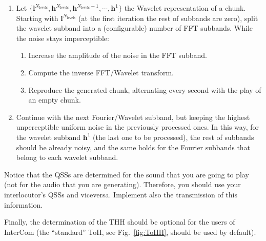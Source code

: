 \begin{enumerate}
\item Let
  $\{{\mathbf l}^{N_{\text{levels}}}, {\mathbf h}^{N_{\text{levels}}},
  {\mathbf h}^{N_{\text{levels}}-1},\cdots, {\mathbf h}^1\}$ the
  Wavelet representation of a
  chunk. %
  Starting with ${\mathbf l}^{N_{\text{levels}}}$ (at the first
  iteration the rest of subbands are zero), split the wavelet subband
  into a (configurable) number of FFT subbands. While the noise stays
  imperceptible:
  \begin{enumerate}
  \item Increase the amplitude of the noise in the FFT subband.
  \item Compute the inverse FFT/Wavelet transform.
  \item Reproduce the generated chunk, alternating every second with
    the play of an empty chunk.
  \end{enumerate}
\item Continue with the next Fourier/Wavelet subband, but keeping the
  highest unperceptible uniform noise in the previously processed
  ones. In this way, for the wavelet subband ${\mathbf h}^1$ (the last
  one to be processed), the rest of subbands should be already
  noisy, and the same holds for the Fourier subbands that
  belong to each wavelet subband.
\end{enumerate}

Notice that the QSSs are determined for the sound that you are going
to play (not for the audio that you are generating). Therefore, you
should use your interlocutor's QSSs and viceversa. Implement also the
transmission of this information.

Finally, the determination of the THH should be optional for the users of
InterCom (the ``standard'' ToH, see Fig.~\ref{fig:ToHH}, should be
used by default).

\begin{comment}
\subsection{Subjective performance}

\begin{enumerate}
\item Using a recording tool such as
  \href{http://audacity.sourceforge.net}{Audacity} or
  \href{http://plugin.org.uk/timemachine/}{JACK Timemachine}, record
  the simulated transmission of a piece of audio and create a
  \texttt{.wav} file, when the audio has been transmitted using
  \texttt{temporal\_overlapped\_DWT\_coding.py} and
  \texttt{threshold.py}, using in both cases the same transmission
  bit-rate. Vary the quantization step size for controlling the
  bit-rate.
\item Determine which audio sounds better, from a subjective point of
  view. Repeat this step the number of times you consider necessary.
\end{enumerate}
\end{comment}

